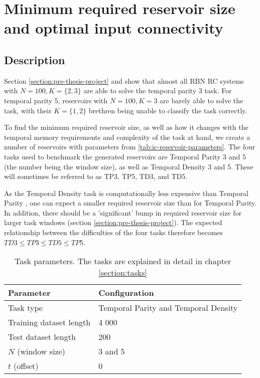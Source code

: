 \section{Minimum required reservoir size and optimal input connectivity}
\label{section:required_reservoir_size}

\subsection{Description}

Section \ref{section:pre-thesis-project} and \cite{burkow2015evolving}
show that almost all RBN RC systems with $N=100, K=\{2, 3\}$ are able to solve the temporal parity 3 task.
For temporal parity 5, reservoirs with $N=100, K=3$ are barely able to solve the task,
with their $K=\{1, 2\}$ brethren being unable to classify the task correctly.

To find the minimum required reservoir size, as well as how it changes with the temporal memory requirements and complexity of the task at hand,
we create a number of reservoirs with parameters from \ref{tab:ic-reservoir-parameters}.
The four tasks used to benchmark the generated reservoirs are Temporal Parity 3 and 5 (the number being the window size),
as well as Temporal Density 3 and 5.
These will sometimes be referred to as TP3, TP5, TD3, and TD5.

As the Temporal Density task is computationally less expensive than Temporal Parity \cite{rbn-reservoir},
one can expect a smaller required reservoir size than for Temporal Parity.
In addition, there should be a 'significant' bump in required reservoir size for larger task windows (section \ref{section:pre-thesis-project}).
The expected relationship between the difficulties of the four tasks therefore becomes $ TD3 \leq TP3 \leq TD5 \leq TP5 $.

\begin{table}[ht]
    \centering
    \caption{Task parameters. The tasks are explained in detail in chapter \ref{section:tasks}}
    \label{tab:tasks}
    \begin{tabular}{ll}
        \hline
        \textbf{Parameter} & \textbf{Configuration} \\
        \hline
        \hline
        Task type               & Temporal Parity and Temporal Density \\
        Training dataset length & 4 000                       \\
        Test dataset length     & 200                         \\
        $N$ (window size)       & 3 and 5                     \\
        $t$ (offset)            & 0 \\
        \hline
    \end{tabular}
\end{table}

